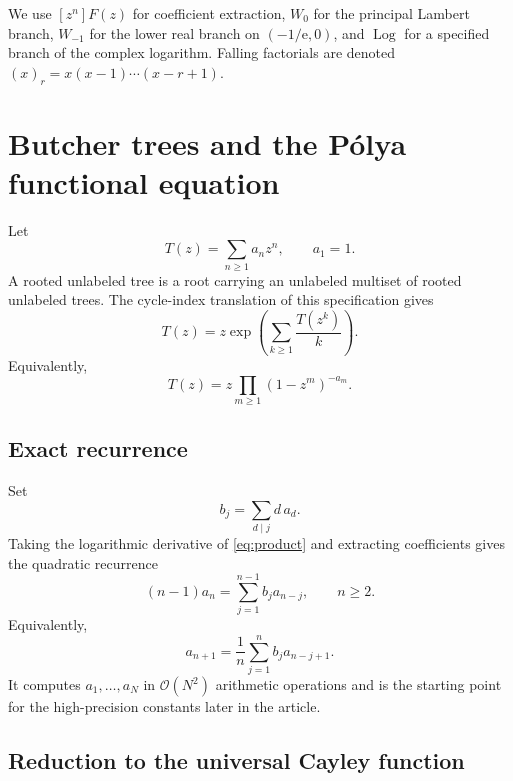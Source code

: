 \documentclass[11pt]{article}
\theoremstyle{definition}
\theoremstyle{remark}
\newcommand{\e}{\mathrm e}
\newcommand{\BigO}{\mathcal O}
\newcommand{\Log}{\operatorname{Log}}
\newcommand{\fall}[2]{(#1)_{#2}}
\begin{document}
We use $[z^n]F(z)$ for coefficient extraction, $W_0$ for the principal
Lambert branch, $W_{-1}$ for the lower real branch on $(-1/\e,0)$, and
$\Log$ for a specified branch of the complex logarithm.  Falling factorials
are denoted $\fall{x}{r}=x(x-1)\cdots(x-r+1)$.

\section{Butcher trees and the P\'olya functional equation}
\label{sec:polya}

Let
\[
 T(z)=\sum_{n\geq1}a_nz^n,\qquad a_1=1.
\]
A rooted unlabeled tree is a root carrying an unlabeled multiset of rooted
unlabeled trees.  The cycle-index translation of this specification gives
\begin{equation}
 T(z)=z\exp\left(\sum_{k\geq1}\frac{T(z^k)}{k}\right).
 \label{eq:polya}
\end{equation}
Equivalently,
\begin{equation}
 T(z)=z\prod_{m\geq1}(1-z^m)^{-a_m}.
 \label{eq:product}
\end{equation}

\subsection{Exact recurrence}

Set
\begin{equation}
 b_j=\sum_{d\mid j}d\,a_d.
 \label{eq:bj}
\end{equation}
Taking the logarithmic derivative of \cref{eq:product} and extracting
coefficients gives the quadratic recurrence
\begin{equation}
 (n-1)a_n=\sum_{j=1}^{n-1}b_j a_{n-j},\qquad n\geq2.
 \label{eq:recurrence}
\end{equation}
Equivalently,
\[
 a_{n+1}=\frac1n\sum_{j=1}^n b_j a_{n-j+1}.
\]
It computes $a_1,\ldots,a_N$ in $\BigO(N^2)$ arithmetic operations and is the
starting point for the high-precision constants later in the article.

\subsection{Reduction to the universal Cayley function}
\end{document}
